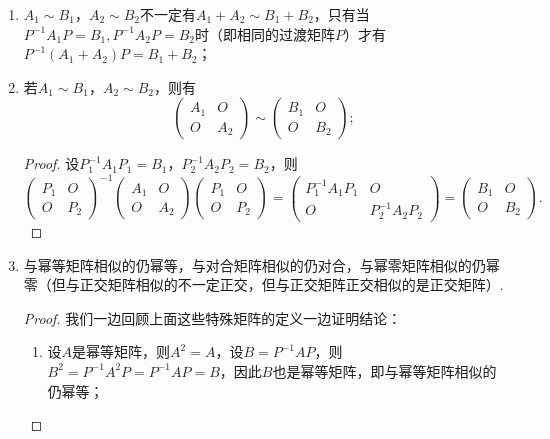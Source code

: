 \begin{enumerate}
    \item $A_1\sim B_1$，$A_2\sim B_2$不一定有$A_1+A_2\sim B_1+B_2$，只有当$P^{-1}A_1P=B_1,P^{-1}A_2P=B_2$时（即相同的过渡矩阵$P$）才有$P^{-1}(A_1+A_2)P=B_1+B_2$；

    \item 若$A_1\sim B_1$，$A_2\sim B_2$，则有
          \[ \begin{pmatrix}
                  A_1 & O \\ O & A_2
              \end{pmatrix}\sim\begin{pmatrix}
                  B_1 & O \\ O & B_2
              \end{pmatrix};\]

          \begin{proof}
              设$P_1^{-1}A_1P_1=B_1$，$P_2^{-1}A_2P_2=B_2$，则
              \[ \begin{pmatrix}
                      P_1 & O \\ O & P_2
                  \end{pmatrix}^{-1}\begin{pmatrix}
                      A_1 & O \\ O & A_2
                  \end{pmatrix}\begin{pmatrix}
                      P_1 & O \\ O & P_2
                  \end{pmatrix}=\begin{pmatrix}
                      P_1^{-1}A_1P_1 & O \\ O & P_2^{-1}A_2P_2
                  \end{pmatrix}=\begin{pmatrix}
                      B_1 & O \\ O & B_2
                  \end{pmatrix}.\]
          \end{proof}

    \item 与幂等矩阵相似的仍幂等，与对合矩阵相似的仍对合，与幂零矩阵相似的仍幂零（但与正交矩阵相似的不一定正交，但与正交矩阵正交相似的是正交矩阵）.

          \begin{proof}
              我们一边回顾上面这些特殊矩阵的定义一边证明结论：
              \begin{enumerate}
                  \item 设$A$是幂等矩阵，则$A^2=A$，设$B=P^{-1}AP$，则$B^2=P^{-1}A^2P=P^{-1}AP=B$，因此$B$也是幂等矩阵，即与幂等矩阵相似的仍幂等；


\end{enumerate}
\end{proof}
\end{enumerate}
